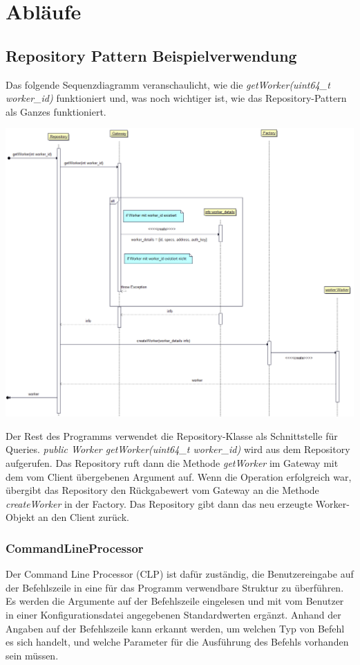 \documentclass[a4paper,12pt]{article}
\begin{document}
\section{Abläufe}
\subsection{Repository Pattern Beispielverwendung}

Das folgende Sequenzdiagramm veranschaulicht, wie die \textit{getWorker(uint64\_t worker\_id)} funktioniert und, was noch wichtiger ist, wie das Repository-Pattern als Ganzes funktioniert.

\includegraphics[width=\textwidth]{repository_sequence_diagram}

Der Rest des Programms verwendet die Repository-Klasse als Schnittstelle für Queries. \textit{public Worker getWorker(uint64\_t worker\_id)} wird aus dem Repository aufgerufen. Das Repository ruft dann die Methode \textit{getWorker} im Gateway mit dem vom Client übergebenen Argument auf. Wenn die Operation erfolgreich war, übergibt das Repository den Rückgabewert vom Gateway an die Methode \textit{createWorker} in der Factory. Das Repository gibt dann das neu erzeugte Worker-Objekt an den Client zurück.


\subsubsection{CommandLineProcessor}

Der Command Line Processor (CLP) ist dafür zuständig, die Benutzereingabe auf der Befehlszeile in eine für das Programm verwendbare Struktur zu überführen. Es werden die Argumente auf der Befehlszeile eingelesen und mit vom Benutzer in einer Konfigurationsdatei angegebenen Standardwerten ergänzt. Anhand der Angaben auf der Befehlszeile kann erkannt werden, um welchen Typ von Befehl es sich handelt, und welche Parameter für die Ausführung des Befehls vorhanden sein müssen.
\end{document}
